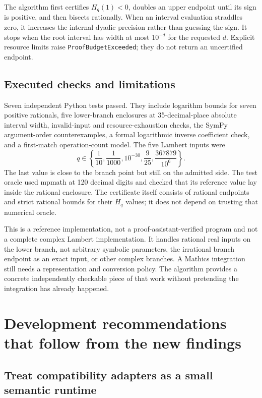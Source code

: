 \documentclass[11pt,letterpaper]{article}
\newcommand{\code}[1]{\texttt{#1}}
\begin{document}
The algorithm first certifies $H_q(1)<0$, doubles an upper endpoint until its sign is positive, and then bisects rationally. When an interval evaluation straddles zero, it increases the internal dyadic precision rather than guessing the sign. It stops when the root interval has width at most $10^{-d}$ for the requested $d$. Explicit resource limits raise \code{ProofBudgetExceeded}; they do not return an uncertified endpoint.

\subsection{Executed checks and limitations}

Seven independent Python tests passed. They include logarithm bounds for seven positive rationals, five lower-branch enclosures at 35-decimal-place absolute interval width, invalid-input and resource-exhaustion checks, the SymPy argument-order counterexamples, a formal logarithmic inverse coefficient check, and a first-match operation-count model. The five Lambert inputs were
\[
 q\in\left\{\frac1{10},\frac1{1000},10^{-30},\frac9{25},\frac{367879}{10^6}\right\}.
\]
The last value is close to the branch point but still on the admitted side. The test oracle used mpmath at 120 decimal digits and checked that its reference value lay inside the rational enclosure. The certificate itself consists of rational endpoints and strict rational bounds for their $H_q$ values; it does not depend on trusting that numerical oracle.

This is a reference implementation, not a proof-assistant-verified program and not a complete complex Lambert implementation. It handles rational real inputs on the lower branch, not arbitrary symbolic parameters, the irrational branch endpoint as an exact input, or other complex branches. A Mathics integration still needs a representation and conversion policy. The algorithm provides a concrete independently checkable piece of that work without pretending the integration has already happened.

\section{Development recommendations that follow from the new findings}

\subsection{Treat compatibility adapters as a small semantic runtime}
\end{document}
